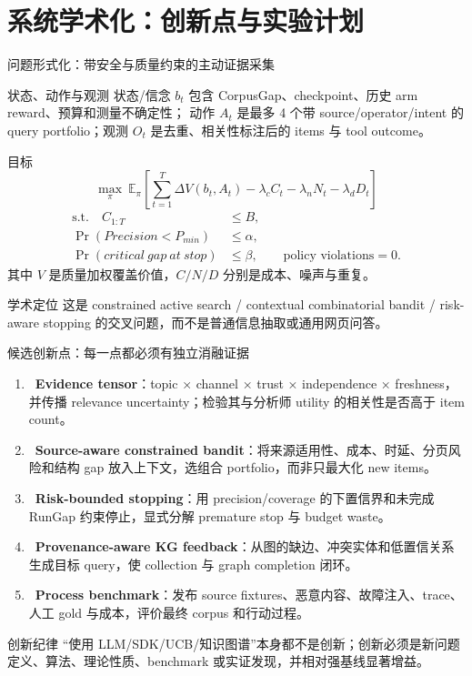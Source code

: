 \section{系统学术化：创新点与实验计划}

\begin{frame}{问题形式化：带安全与质量约束的主动证据采集}
\scriptsize
\begin{block}{状态、动作与观测}
状态/信念 $b_t$ 包含 CorpusGap、checkpoint、历史 arm reward、预算和测量不确定性；
动作 $A_t$ 是最多 4 个带 source/operator/intent 的 query portfolio；观测 $O_t$ 是去重、相关性标注后的 items 与 tool outcome。
\end{block}

\begin{block}{目标}
\[
\max_{\pi}\ \mathbb E_{\pi}\left[\sum_{t=1}^{T}
\Delta V(b_t,A_t)-\lambda_c C_t-\lambda_n N_t-\lambda_d D_t\right]
\]
\[
\begin{aligned}
\text{s.t.}\quad C_{1:T}&\le B,\\
\Pr(Precision<P_{min})&\le\alpha,\\
\Pr(critical\ gap\ at\ stop)&\le\beta,\qquad
\text{policy violations}=0.
\end{aligned}
\]
其中 $V$ 是质量加权覆盖价值，$C/N/D$ 分别是成本、噪声与重复。
\end{block}

\begin{alertblock}{学术定位}
这是 constrained active search / contextual combinatorial bandit / risk-aware stopping 的交叉问题，而不是普通信息抽取或通用网页问答。
\end{alertblock}
\end{frame}

\begin{frame}{候选创新点：每一点都必须有独立消融证据}
\small
\begin{enumerate}
  \item \research\ \textbf{Evidence tensor}：topic × channel × trust × independence × freshness，并传播 relevance uncertainty；检验其与分析师 utility 的相关性是否高于 item count。
  \item \research\ \textbf{Source-aware constrained bandit}：将来源适用性、成本、时延、分页风险和结构 gap 放入上下文，选组合 portfolio，而非只最大化 new items。
  \item \research\ \textbf{Risk-bounded stopping}：用 precision/coverage 的下置信界和未完成 RunGap 约束停止，显式分解 premature stop 与 budget waste。
  \item \research\ \textbf{Provenance-aware KG feedback}：从图的缺边、冲突实体和低置信关系生成目标 query，使 collection 与 graph completion 闭环。
  \item \research\ \textbf{Process benchmark}：发布 source fixtures、恶意内容、故障注入、trace、人工 gold 与成本，评价最终 corpus 和行动过程。
\end{enumerate}

\begin{block}{创新纪律}
“使用 LLM/SDK/UCB/知识图谱”本身都不是创新；创新必须是新问题定义、算法、理论性质、benchmark 或实证发现，并相对强基线显著增益。
\end{block}
\end{frame}

